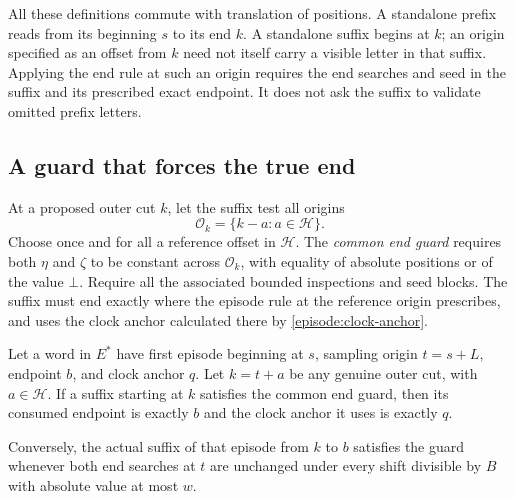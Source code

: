 All these definitions commute with translation of positions.  A standalone
prefix reads from its beginning $s$ to its end $k$.  A standalone suffix
begins at $k$; an origin specified as an offset from $k$ need not itself
carry a visible letter in that suffix.  Applying the end rule at such an
origin requires the end searches and seed in the suffix and its prescribed
exact endpoint.  It does not ask the suffix to validate omitted prefix
letters.

\subsection{A guard that forces the true end}

At a proposed outer cut $k$, let the suffix test all origins
\begin{equation}\label{episode:outer-origins}
 \mathcal O_k=\{k-a:a\in\mathcal H\}.
\end{equation}
Choose once and for all a reference offset in $\mathcal H$.  The
\emph{common end guard} requires both $\eta$ and $\zeta$ to be constant
across $\mathcal O_k$, with equality of absolute positions or of the value
$\bot$.  Require all the associated bounded inspections and seed blocks.
The suffix must end exactly where the episode rule at the reference
origin prescribes, and uses the clock anchor calculated there by
\eqref{episode:clock-anchor}.

\begin{lemma}\label{episode:shared-end}
Let a word in $E^*$ have first episode beginning at $s$, sampling origin
$t=s+L$, endpoint $b$, and clock anchor $q$.  Let $k=t+a$ be any genuine
outer cut, with $a\in\mathcal H$.  If a suffix starting at $k$ satisfies
the common end guard, then its consumed endpoint is exactly $b$ and the
clock anchor it uses is exactly $q$.

Conversely, the actual suffix of that episode from $k$ to $b$ satisfies
the guard whenever both end searches at $t$ are unchanged under every
shift divisible by $B$ with absolute value at most $w$.
\end{lemma}

